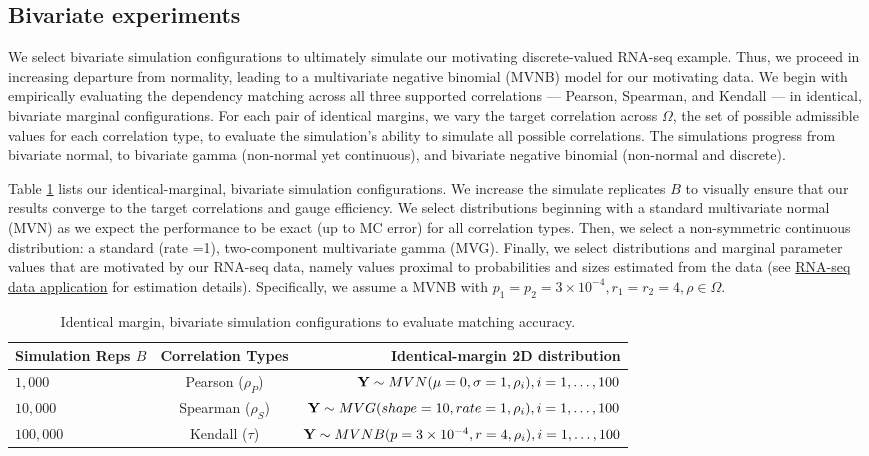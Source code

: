 \documentclass[
]{jss}
\begin{document}
\hypertarget{bivariate-experiments}{%
\subsection{Bivariate experiments}\label{bivariate-experiments}}

We select bivariate simulation configurations to ultimately simulate our motivating discrete-valued RNA-seq example. Thus, we proceed in increasing departure from normality, leading to a multivariate negative binomial (MVNB) model for our motivating data. We begin with empirically evaluating the dependency matching across all three supported correlations --- Pearson, Spearman, and Kendall --- in identical, bivariate marginal configurations. For each pair of identical margins, we vary the target correlation across \(\Omega\), the set of possible admissible values for each correlation type, to evaluate the simulation's ability to simulate all possible correlations. The simulations progress from bivariate normal, to bivariate gamma (non-normal yet continuous), and bivariate negative binomial (non-normal and discrete).

Table \ref{tab:sims} lists our identical-marginal, bivariate simulation configurations. We increase the simulate replicates \(B\) to visually ensure that our results converge to the target correlations and gauge efficiency. We select distributions beginning with a standard multivariate normal (MVN) as we expect the performance to be exact (up to MC error) for all correlation types. Then, we select a non-symmetric continuous distribution: a standard (rate =1), two-component multivariate gamma (MVG). Finally, we select distributions and marginal parameter values that are motivated by our RNA-seq data, namely values proximal to probabilities and sizes estimated from the data (see \href{examples}{RNA-seq data application} for estimation details). Specifically, we assume a MVNB with \(p_1 = p_2 = 3\times10^{-4}, r_1 = r_2 = 4, \rho \in \Omega\).

\begin{table}[]
\centering
\caption{ \label{tab:sims} Identical margin, bivariate simulation configurations to evaluate matching accuracy.}
\begin{tabular}{@{}lcr@{}}
\toprule
Simulation Reps $B$ & Correlation Types & Identical-margin 2D distribution \\ \midrule
$1,000$ & Pearson ($\rho_P$) & ${\bf Y} \sim MVN( \mu= 0 , \sigma = 1, \rho_i ), i=1,\ldots,100$ \\
$10,000$ & Spearman ($\rho_S$) & ${\bf Y} \sim MVG( shape = 10, rate = 1, \rho_i ), i=1,\ldots,100$ \\
$100,000$ & Kendall ($\tau$) & ${\bf Y} \sim MVNB(p = 3\times10^{-4}, r = 4,\rho_i), i=1,\ldots,100$ \\ \bottomrule
\end{tabular}
\end{table}
\end{document}
